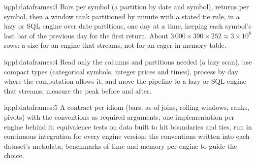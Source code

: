 \begin{solution}{iq:pl:dataframes:3}
Bars per symbol (a partition by date and symbol), returns per symbol, then a window rank partitioned by minute with a stated tie rule, in a
lazy or SQL engine over date partitions, one day at a time, keeping each symbol's last bar of the previous day for the first return. About
$3\,000 \times 390 \times 252 \approx 3\times10^8$ rows: a size for an engine that streams, not for an eager in-memory table.
\end{solution}

\begin{solution}{iq:pl:dataframes:4}
Read only the columns and partitions needed (a lazy scan), use compact types (categorical symbols, integer prices and times), process by
day where the computation allows it, and move the pipeline to a lazy or SQL engine that streams; measure the peak before and after.
\end{solution}

\begin{solution}{iq:pl:dataframes:5}
A contract per idiom (bars, as-of joins, rolling windows, ranks, pivots) with the conventions as required arguments; one implementation per
engine behind it; equivalence tests on data built to hit boundaries and ties, run in continuous integration for every engine version; the
conventions written into each dataset's metadata; benchmarks of time and memory per engine to guide the choice.
\end{solution}
